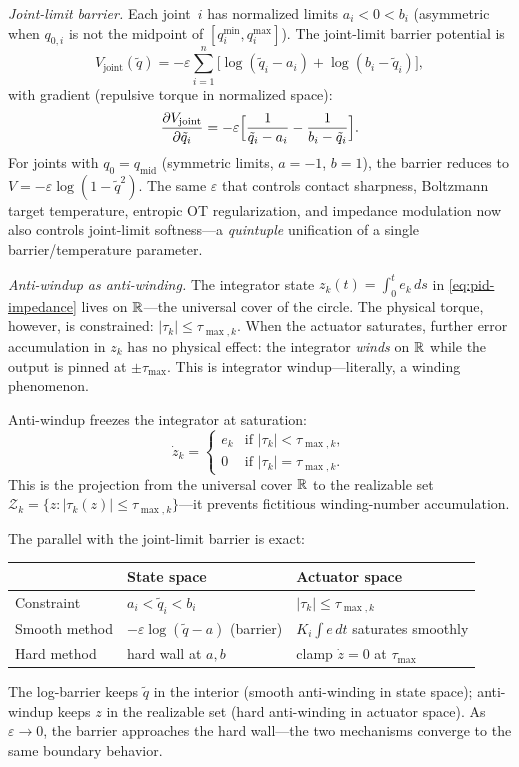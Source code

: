 \medskip\noindent\emph{Joint-limit barrier.}
Each joint~$i$ has normalized limits $a_i < 0 < b_i$ (asymmetric when
$q_{0,i}$ is not the midpoint of $[q_i^{\min}, q_i^{\max}]$).
The joint-limit barrier potential is
\begin{equation}\label{eq:joint-barrier}
V_{\mathrm{joint}}(\tilde{q})
= -\varepsilon \sum_{i=1}^{n}
  \bigl[\log(\tilde{q}_i - a_i) + \log(b_i - \tilde{q}_i)\bigr],
\end{equation}
with gradient (repulsive torque in normalized space):
\[
\frac{\partial V_{\mathrm{joint}}}{\partial \tilde{q}_i}
= -\varepsilon\Bigl[
  \frac{1}{\tilde{q}_i - a_i} - \frac{1}{b_i - \tilde{q}_i}
\Bigr].
\]
For joints with $q_0 = q_{\mathrm{mid}}$ (symmetric limits, $a = -1$,
$b = 1$), the barrier reduces to
$V = -\varepsilon\log(1 - \tilde{q}^2)$.
The same $\varepsilon$ that controls contact sharpness, Boltzmann target temperature,
entropic OT regularization, and impedance modulation now also controls
joint-limit softness---a \emph{quintuple} unification of a single
barrier/temperature parameter.

\medskip\noindent\emph{Anti-windup as anti-winding.}
The integrator state $z_k(t) = \int_0^t e_k\,ds$ in \eqref{eq:pid-impedance}
lives on $\mathbb{R}$---the universal cover of the circle.
The physical torque, however, is constrained:
$|\tau_k| \leq \tau_{\max,k}$.
When the actuator saturates, further error accumulation in $z_k$ has no
physical effect: the integrator \emph{winds} on $\mathbb{R}$ while the output
is pinned at $\pm\tau_{\max}$.
This is integrator windup---literally, a winding phenomenon.

Anti-windup freezes the integrator at saturation:
\begin{equation}\label{eq:anti-windup}
\dot{z}_k =
\begin{cases}
e_k & \text{if } |\tau_k| < \tau_{\max,k}, \\
0   & \text{if } |\tau_k| = \tau_{\max,k}.
\end{cases}
\end{equation}
This is the projection from the universal cover $\mathbb{R}$ to the realizable
set $\mathcal{Z}_k = \{z : |\tau_k(z)| \leq \tau_{\max,k}\}$---it prevents
fictitious winding-number accumulation.

The parallel with the joint-limit barrier is exact:
\begin{center}
\begin{tabular}{lll}
& \textbf{State space} & \textbf{Actuator space} \\
\hline
Constraint & $a_i < \tilde{q}_i < b_i$ & $|\tau_k| \leq \tau_{\max,k}$ \\
Smooth method & $-\varepsilon\log(\tilde{q}-a)$ (barrier) &
  $K_i \int e\,dt$ saturates smoothly \\
Hard method & hard wall at $a, b$ & clamp $\dot{z}=0$ at $\tau_{\max}$
\end{tabular}
\end{center}
The log-barrier keeps $\tilde{q}$ in the interior (smooth anti-winding in
state space); anti-windup keeps $z$ in the realizable set (hard
anti-winding in actuator space).
As $\varepsilon \to 0$, the barrier approaches the hard wall---the two
mechanisms converge to the same boundary behavior.

